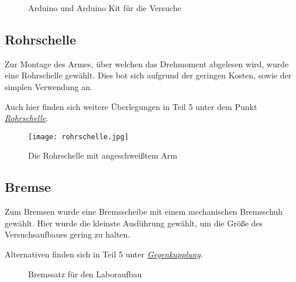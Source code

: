 \begin{figure}[H]
    \centering
    \hfill
    \hfill
    \hfill
    \caption{Arduino und Arduino Kit für die Versuche}
\end{figure}

\subsection{Rohrschelle}

Zur Montage des Armes, über welchen das Drehmoment abgelesen wird, wurde eine Rohrschelle gewählt.
Dies bot sich aufgrund der geringen Kosten, sowie der simplen Verwendung an.

Auch hier finden sich weitere Überlegungen in Teil 5 unter dem Punkt \hyperref[rohrschelle]{\textit{Rohrschelle}}.

\begin{figure}[H]
    \begin{center}
        \texttt{[image: rohrschelle.jpg]}
        \caption{Die Rohrschelle mit angeschweißtem Arm}
    \end{center}
\end{figure}

\subsection{Bremse}

Zum Bremsen wurde eine Bremsscheibe mit einem mechanischen Bremsschuh gewählt.
Hier wurde die kleinste Ausführung gewählt, um die Größe des Versuchsaufbaues gering zu halten.

Alternativen finden sich in Teil 5 unter \hyperref[gegenkupplung]{\textit{Gegenkupplung}}.

\begin{figure}[H]
    \centering
    \hfill
    \hfill
    \hfill
    \caption{Bremssatz für den Laboraufbau}
\end{figure}